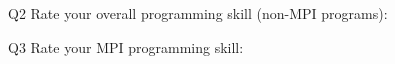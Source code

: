 \begin{description}%
\item{Q2} Rate your overall programming skill (non-MPI programs):%
\item{Q3} Rate your MPI programming skill:%
\end{description}%
